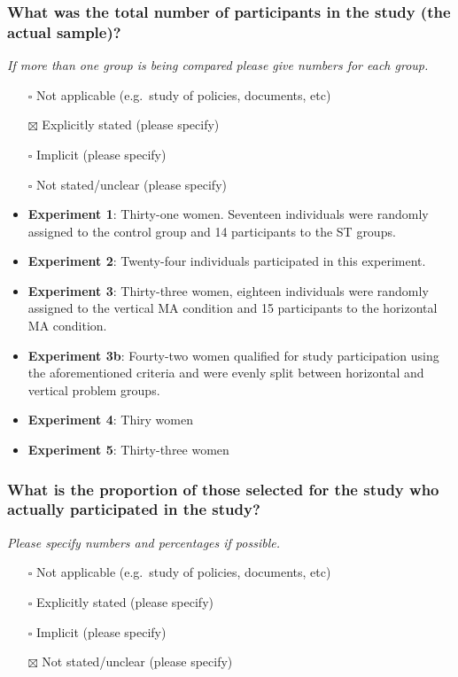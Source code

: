 \documentclass[
  doc, a4paper]{apa7}
\providecommand{\tightlist}{%
  \setlength{\itemsep}{0pt}\setlength{\parskip}{0pt}}
\begin{document}
\subsubsection{What was the total number of participants in the study (the actual sample)?}\label{what-was-the-total-number-of-participants-in-the-study-the-actual-sample}

\emph{If more than one group is being compared please give numbers for each group.}

\begin{itemize}
\item[$\square$]
  Not applicable (e.g.~study of policies, documents, etc)
\item[$\boxtimes$]
  Explicitly stated (please specify)
\item[$\square$]
  Implicit (please specify)
\item[$\square$]
  Not stated/unclear (please specify)
\item
  \textbf{Experiment 1}: Thirty-one women. Seventeen individuals were randomly assigned to the control group and 14 participants to the ST groups.\\
\item
  \textbf{Experiment 2}: Twenty-four individuals participated in this experiment.
\item
  \textbf{Experiment 3}: Thirty-three women, eighteen individuals were randomly assigned to the vertical MA condition and 15 participants to the horizontal MA condition.
\item
  \textbf{Experiment 3b}: Fourty-two women qualified for study participation using the aforementioned criteria and were evenly split between horizontal and vertical problem groups.
\item
  \textbf{Experiment 4}: Thiry women
\item
  \textbf{Experiment 5}: Thirty-three women
\end{itemize}

\subsubsection{What is the proportion of those selected for the study who actually participated in the study?}\label{what-is-the-proportion-of-those-selected-for-the-study-who-actually-participated-in-the-study}

\emph{Please specify numbers and percentages if possible.}

\begin{itemize}
\tightlist
\item[$\square$]
  Not applicable (e.g.~study of policies, documents, etc)
\item[$\square$]
  Explicitly stated (please specify)
\item[$\square$]
  Implicit (please specify)
\item[$\boxtimes$]
  Not stated/unclear (please specify)
\end{itemize}
\end{document}
